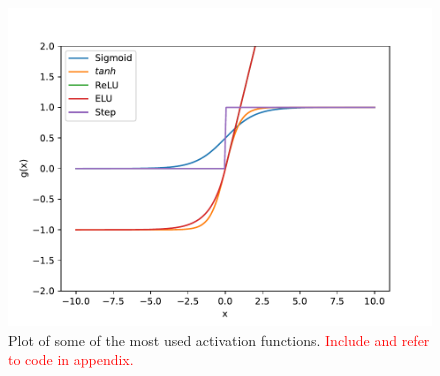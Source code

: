 \begin{figure}
    \centering
    \includegraphics[width=\textwidth,height=\textheight,keepaspectratio]{pics/act_func_fig.pdf}
    \caption{Plot of some of the most used activation functions. \textcolor{red}{Include and refer to code in appendix.}}
    \label{fig:act_funcs}
\end{figure}


